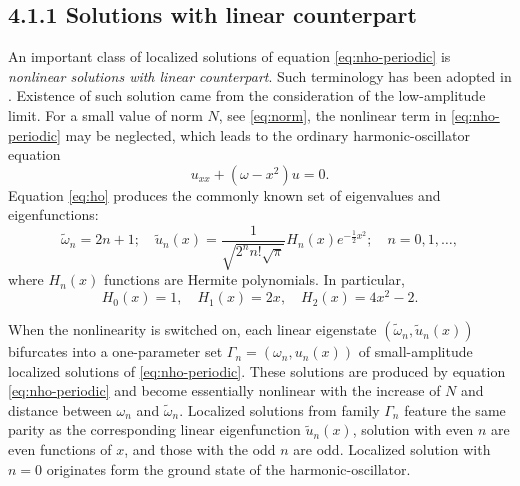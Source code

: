\subsection*{4.1.1 Solutions with linear counterpart}

An important class of localized solutions of equation \eqref{eq:nho-periodic} is {\it nonlinear solutions with linear counterpart}.
Such terminology has been adopted in \cite{AgostaMalomedPresilla, AgostaPresilla}.
Existence of such solution came from the consideration of the low-amplitude limit.
For a small value of norm $N$, see \eqref{eq:norm}, the nonlinear term in \eqref{eq:nho-periodic} may be neglected, which leads to the ordinary harmonic-oscillator equation
\begin{equation}
	u_{xx} + (\omega - x^2) u = 0.
\label{eq:ho}
\end{equation}
Equation \eqref{eq:ho} produces the commonly known set of eigenvalues and eigenfunctions:
\begin{equation}
	\tilde{\omega}_n = 2n + 1; \quad \tilde{u}_n(x) = \dfrac{1}{\sqrt{2^n n! \sqrt{\pi}}} H_n(x) e^{-\frac{1}{2} x^2}; \quad n = 0, 1, \dots,
\label{eq:ho-solutions}
\end{equation}
where $H_n(x)$ functions are Hermite polynomials.
In particular,
\begin{equation*}
	H_0(x) = 1, \quad H_1(x) = 2x, \quad H_2(x) = 4x^2 - 2.	
\end{equation*}

When the nonlinearity is switched on, each linear eigenstate $(\tilde{\omega}_n, \tilde{u}_n(x))$ bifurcates into a one-parameter set $\Gamma_n = (\omega_n, u_n(x))$ of small-amplitude localized solutions of \eqref{eq:nho-periodic}.
These solutions are produced by equation \eqref{eq:nho-periodic} and become essentially nonlinear with the increase of $N$ and distance between $\omega_n$ and $\tilde{\omega}_n$.
Localized solutions from family $\Gamma_n$ feature the same parity as the corresponding linear eigenfunction $\tilde{u}_n(x)$, solution with even $n$ are even functions of $x$, and those with the odd $n$ are odd.
Localized solution with $n = 0$ originates form the ground state of the harmonic-oscillator.

